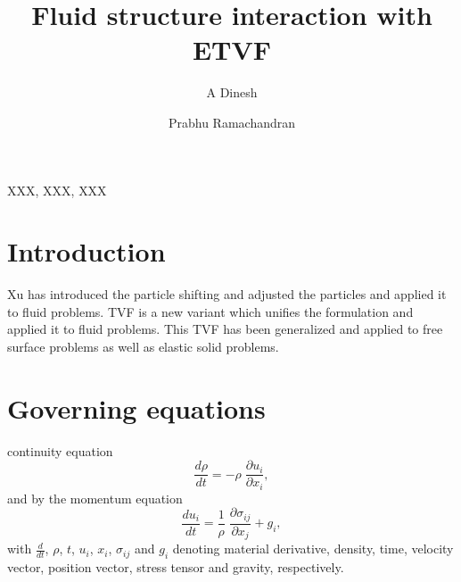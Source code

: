 \documentclass[preprint,12pt]{elsarticle}
\begin{document}
\begin{frontmatter}

  \title{Fluid structure interaction with ETVF}
  \author[IITB]{A Dinesh}
  \author[IITB]{Prabhu Ramachandran}
  \address[IITB]{Department of Aerospace Engineering, Indian Institute of
    Technology Bombay, Powai, Mumbai 400076}


\begin{abstract}
\end{abstract}

\begin{keyword}
{XXX}, {XXX}, {XXX}


\end{keyword}

\end{frontmatter}




\section{Introduction}
\label{sec:intro}

Xu has introduced the particle shifting and adjusted the particles and applied
it to fluid problems. TVF is a new variant which unifies the formulation and
applied it to fluid problems. This TVF has been generalized and applied to free
surface problems as well as elastic solid problems.



\section{Governing equations}

continuity equation
\begin{equation}
  \label{eq:ce}
  \frac{d \rho}{d t} = - \rho \; \frac{\partial u_i}{\partial x_i},
\end{equation}
and by the momentum equation
\begin{equation}
  \label{eq:me}
  \frac{d u_i}{d t} = \frac{1}{\rho} \; \frac{\partial \sigma_{ij}}{\partial x_j}
  + g_i,
\end{equation}
with $\frac{{d} }{d t}$, $\rho$, $t$, $u_i$, $x_i$, $\sigma_{ij}$ and $g_{i}$
denoting material derivative, density, time, velocity vector, position vector,
stress tensor and gravity, respectively.
\end{document}
